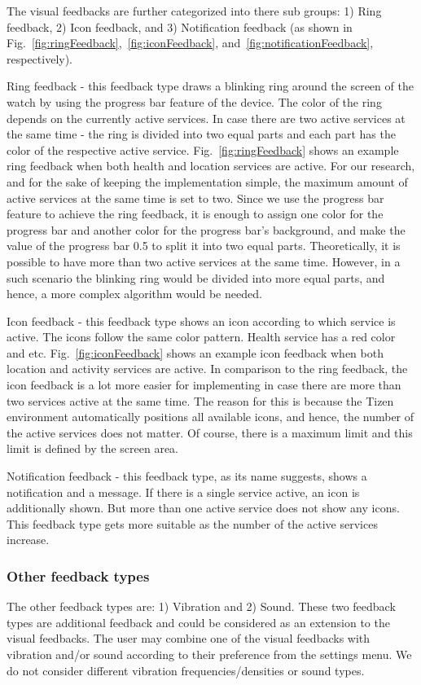 \documentclass[conference, a4paper, 10pt, twocolumn]{IEEEtran}
\begin{document}
The visual feedbacks are further categorized into there sub groups: 1) Ring feedback, 2) Icon feedback, and 3) Notification feedback (as shown in Fig.~\ref{fig:ringFeedback},~\ref{fig:iconFeedback}, and~\ref{fig:notificationFeedback}, respectively).

Ring feedback - this feedback type draws a blinking ring around the screen of the watch by using the progress bar feature of the device. The color of the ring depends on the currently active services. In case there are two active services at the same time - the ring is divided into two equal parts and each part has the color of the respective active service. Fig.~\ref{fig:ringFeedback} shows an example ring feedback when both health and location services are active. For our research, and for the sake of keeping the implementation simple, the maximum amount of active services at the same time is set to two. Since we use the progress bar feature to achieve the ring feedback, it is enough to assign one color for the progress bar and another color for the progress bar's background, and make the value of the progress bar 0.5 to split it into two equal parts. Theoretically, it is possible to have more than two active services at the same time. However, in a such scenario the blinking ring would be divided into more equal parts, and hence, a more complex algorithm would be needed. 

Icon feedback - this feedback type shows an icon according to which service is active. The icons follow the same color pattern. Health service has a red color and etc. Fig.~\ref{fig:iconFeedback} shows an example icon feedback when both location and activity services are active. In comparison to the ring feedback, the icon feedback is a lot more easier for implementing in case there are more than two services active at the same time. The reason for this is because the Tizen environment automatically positions all available icons, and hence, the number of the active services does not matter. Of course, there is a maximum limit and this limit is defined by the screen area.

Notification feedback - this feedback type, as its name suggests, shows a notification and a message. If there is a single service active, an icon is additionally shown. But more than one active service does not show any icons. This feedback type gets more suitable as the number of the active services increase.

\subsubsection{Other feedback types}
The other feedback types are: 1) Vibration and 2) Sound. These two feedback types are additional feedback and could be considered as an extension to the visual feedbacks. The user may combine one of the visual feedbacks with vibration and/or sound according to their preference from the settings menu. We do not consider different vibration frequencies/densities or sound types. 
\end{document}
